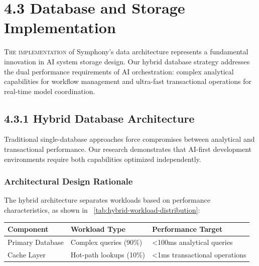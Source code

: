 
\section{4.3 Database and Storage Implementation}
\label{sec:database-impl}

\vspace{0.3cm}
\lettrine{T}{he implementation} of Symphony's data architecture represents a fundamental innovation in AI system storage design. Our hybrid database strategy addresses the dual performance requirements of AI orchestration: complex analytical capabilities for workflow management and ultra-fast transactional operations for real-time model coordination.

\subsection*{4.3.1 Hybrid Database Architecture}

Traditional single-database approaches force compromises between analytical and transactional performance. Our research demonstrates that AI-first development environments require both capabilities optimized independently.

\subsubsection*{Architectural Design Rationale}

The hybrid architecture separates workloads based on performance characteristics, as shown in ~\ref{tab:hybrid-workload-distribution}:

\begin{center}
\begin{tabular}{@{}lll@{}}
\toprule
\textbf{Component} & \textbf{Workload Type} & \textbf{Performance Target} \\
\midrule
Primary Database & Complex queries (90\%) & <100ms analytical queries \\
Cache Layer & Hot-path lookups (10\%) & <1ms transactional operations \\
\bottomrule
\end{tabular}
\label{tab:hybrid-workload-distribution}
\end{center}

